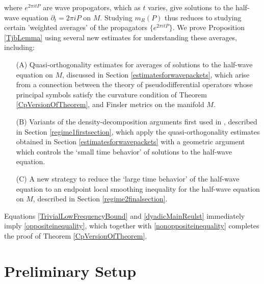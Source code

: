 %
where $e^{2 \pi i t P}$ are wave propogators, which as $t$ varies, give 
%
%
solutions to the half-wave equation $\partial_t = 2 \pi i P$ on $M$. Studying $m_R(P)$ thus reduces to studying certain 'weighted averages' of the propagators $\{ e^{2 \pi i t P} \}$. We prove Proposition \ref{TjbLemma} using several new estimates for understanding these averages, including:
%
\begin{itemize}
    \item[(A)] Quasi-orthogonality estimates for averages of solutions to the half-wave equation on $M$, discussed in Section \ref{estimatesforwavepackets}, which arise from a connection between the theory of pseudodifferential operators whose principal symbols satisfy the curvature condition of Theorem \ref{CpVersionOfTheorem}, and Finsler metrics on the manifold $M$.

    \item[(B)] Variants of the density-decomposition arguments first used in \cite{HeoandNazarovandSeeger}, described in Section \ref{regime1firstsection}, which apply the quasi-orthogonality estimates obtained in Section \ref{estimatesforwavepackets} with a geometric argument which controls the `small time behavior' of solutions to the half-wave equation.

    \item[(C)] A new strategy to reduce the `large time behavior' of the half-wave equation to an endpoint local smoothing inequality for the half-wave equation on $M$, described in Section \ref{regime2finalsection}.
\end{itemize}
%
Equations \eqref{TrivialLowFrequencyBound} and \eqref{dyadicMainReulst} immediately imply \eqref{oppositeinequality}, which together with \eqref{nonoppositeinequality} completes the proof of Theorem \ref{CpVersionOfTheorem}.


\section{Preliminary Setup} \label{PrelimSetup}

%
%
%
%
%
%
%
%
%
%
%
%
%
%

